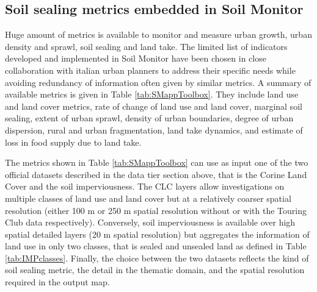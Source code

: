 \documentclass[APA,LATO1COL,doublespace]{WileyNJD-v2}
\newcommand{\update}[1]{\emph{\textcolor{blue}{#1}}}     %
\begin{document}
\subsection{Soil sealing metrics embedded in Soil Monitor } %
\label{sec:metrics}
Huge amount of metrics is available to monitor and measure urban growth, urban density and sprawl, soil sealing and land take.
The limited list of indicators developed and implemented in Soil Monitor have been chosen in close collaboration with italian urban planners to address their specific needs while avoiding redundancy of information often given by similar metrics. 
A summary of available metrics is given in Table \ref{tab:SMappToolbox}.
They include land use and land cover metrics, rate of change of land use and land cover, marginal soil sealing, extent of urban sprawl, density of urban boundaries, degree of urban dispersion, rural and urban fragmentation, land take dynamics, and estimate of loss in food supply due to land take. 

The metrics shown in Table \ref{tab:SMappToolbox} can use as input one of the two official datasets described in the data tier section above, that is the Corine Land Cover and the soil imperviousness. 
The CLC layers allow investigations on multiple classes of land use and land cover but at a relatively coarser spatial resolution (either 100 m or 250 m spatial resolution without or with the Touring Club data respectively).
Conversely, soil imperviousness is available over high spatial detailed layers (20 m spatial resolution) but aggregates the information of land use in only two classes, that is sealed and unsealed land as defined in Table \ref{tab:IMPclasses}. 
Finally, the choice between the two datasets reflects the kind of soil sealing metric, the detail in the thematic domain, and the spatial resolution required in the output map.
\end{document}
